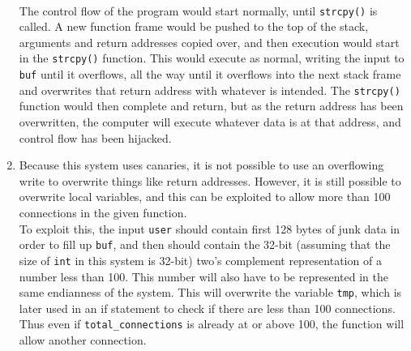 \documentclass{jhwhw}
\begin{document}
\begin{enumerate}
\\ The control flow of the program would start normally, until \verb^strcpy()^ is called. A new function frame would be pushed to the top of the stack, arguments and return addresses copied over, and then execution would start in the \verb^strcpy()^ function. This would execute as normal, writing the input to \verb^buf^ until it overflows, all the way until it overflows into the next stack frame and overwrites that return address with whatever is intended. The \verb^strcpy()^ function would then complete and return, but as the return address has been overwritten, the computer will execute whatever data is at that address, and control flow has been hijacked.

\item Because this system uses canaries, it is not possible to use an overflowing write to overwrite things like return addresses. However, it is still possible to overwrite local variables, and this can be exploited to allow more than 100 connections in the given function.
\\
To exploit this, the input \verb^user^ should contain first 128 bytes of junk data in order to fill up \verb^buf^, and then should contain the 32-bit (assuming that the size of \verb^int^ in this system is 32-bit) two's complement representation of a number less than 100. This number will also have to be represented in the same endianness of the system. This will overwrite the variable \verb^tmp^, which is later used in an if statement to check if there are less than 100 connections. Thus even if \verb^total_connections^ is already at or above 100, the function will allow another connection.
\end{enumerate}
\end{document}
